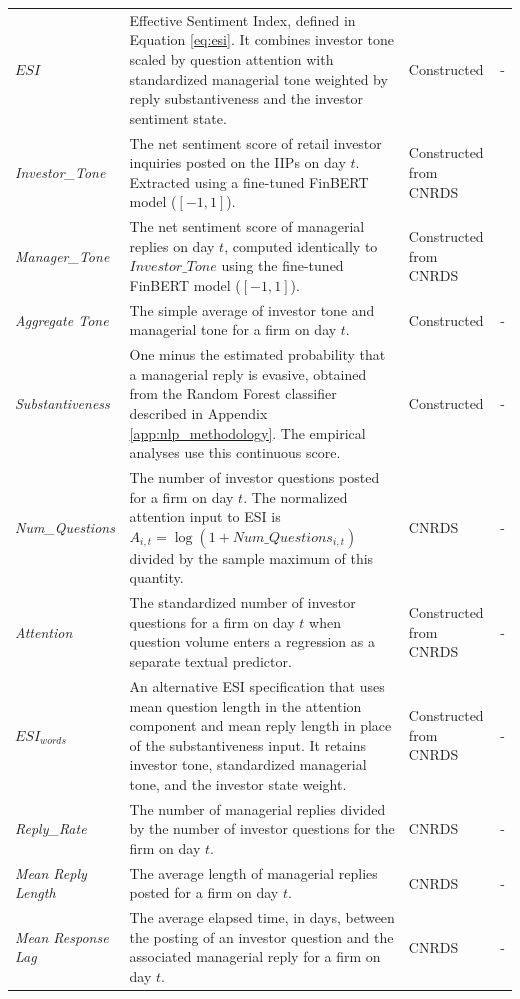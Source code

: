 \documentclass[12pt]{article}
\begin{document}
\begin{xltabular}{\textwidth}{@{} >{\RaggedRight\arraybackslash}p{3.1cm} >{\RaggedRight\arraybackslash}X >{\RaggedRight\arraybackslash}p{2.6cm} >{\RaggedRight\arraybackslash}p{2.8cm} @{}}
  $ESI$ & Effective Sentiment Index, defined in Equation \ref{eq:esi}. It combines investor tone scaled by question attention with standardized managerial tone weighted by reply substantiveness and the investor sentiment state. & Constructed & - \\
  \addlinespace
  \textit{Investor\_Tone} & The net sentiment score of retail investor inquiries posted on the IIPs on day $t$. Extracted using a fine-tuned FinBERT model ($[-1, 1]$). & Constructed from CNRDS & \cite{liu2020finbert} \\
  \addlinespace
  \textit{Manager\_Tone} & The net sentiment score of managerial replies on day $t$, computed identically to $Investor\_Tone$ using the fine-tuned FinBERT model ($[-1, 1]$). & Constructed from CNRDS & \cite{liu2020finbert} \\
  \addlinespace
  \textit{Aggregate Tone} & The simple average of investor tone and managerial tone for a firm on day $t$. & Constructed & - \\
  \addlinespace
  \textit{Substantiveness} & One minus the estimated probability that a managerial reply is evasive, obtained from the Random Forest classifier described in Appendix \ref{app:nlp_methodology}. The empirical analyses use this continuous score. & Constructed & - \\
  \addlinespace
  \textit{Num\_Questions} & The number of investor questions posted for a firm on day $t$. The normalized attention input to ESI is $A_{i,t}=\log(1+Num\_Questions_{i,t})$ divided by the sample maximum of this quantity. & CNRDS & - \\
  \addlinespace
  \textit{Attention} & The standardized number of investor questions for a firm on day $t$ when question volume enters a regression as a separate textual predictor. & Constructed from CNRDS & - \\
  \addlinespace
  $ESI_{words}$ & An alternative ESI specification that uses mean question length in the attention component and mean reply length in place of the substantiveness input. It retains investor tone, standardized managerial tone, and the investor state weight. & Constructed from CNRDS & - \\
  \addlinespace
  \textit{Reply\_Rate} & The number of managerial replies divided by the number of investor questions for the firm on day $t$. & CNRDS & -\\
  \addlinespace
  \textit{Mean Reply Length} & The average length of managerial replies posted for a firm on day $t$. & CNRDS & - \\
  \addlinespace
  \textit{Mean Response Lag} & The average elapsed time, in days, between the posting of an investor question and the associated managerial reply for a firm on day $t$. & CNRDS & - \\
  \midrule


\end{xltabular}
\end{document}

